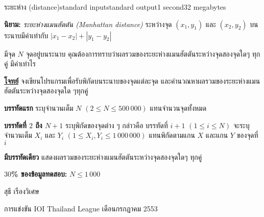 \documentclass[11pt,a4paper]{article}
\begin{document}
\begin{problem}{ระยะห่าง (distance)}{standard input}{standard output}{1 second}{32 megabytes}

\textbf{นิยาม:} \textit{ระยะห่างแมนฮัตตัน (Manhattan distance)} ระหว่างจุด $(x_1, y_1)$ และ $(x_2, y_2)$ บนระนาบมีค่าเท่ากับ $|x_1 - x_2| + |y_1 - y_2|$

มีจุด $N$ จุดอยู่บนระนาบ คุณต้องการทราบว่าผลรวมของระยะห่างแมนฮัตตันระหว่างจุดสองจุดใดๆ ทุกคู่ มีค่าเท่าไร


\bigskip
\underline{\textbf{โจทย์}}  จงเขียนโปรแกรมเพื่อรับพิกัดบนระนาบของจุดแต่ละจุด และคำนวณหาผลรวมของระยะห่างแมนฮัตตันระหว่างจุดสองจุดใด ๆทุกคู่



\InputFile

\textbf{บรรทัดแรก} ระบุจำนวนเต็ม $N$ $(2 \leq N \leq 500\,000)$ แทนจำนวนจุดทั้งหมด

\textbf{บรรทัดที่ $2$ ถึง $N+1$} ระบุพิกัดของจุดต่าง ๆ กล่าวคือ บรรทัดที่ $i+1$ $(1 \leq i \leq N)$ จะระบุจำนวนเต็ม $X_i$ และ $Y_i$ $(1 \leq X_i,Y_i \leq 1\,000\,000)$ แทนพิกัดตามแกน $X$ และแกน $Y$ ของจุดที่ $i$

\OutputFile

\textbf{มีบรรทัดเดียว} แสดงผลรวมของระยะห่างแมนฮัตตันระหว่างจุดสองจุดใดๆ ทุกคู่

\Examples

\begin{example}
%
%
\end{example}

\Scoring

\textbf{$30$\% ของข้อมูลทดสอบ:} $N \leq 1\,000$

\Source

สุธี เรืองวิเศษ

การแข่งขัน IOI Thailand League เดือนกรกฏาคม 2553

\end{problem}
\end{document}
